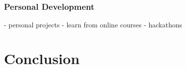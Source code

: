 \documentclass[10pt,letterpaper]{article}
\begin{document}
\subsubsection{Personal Development}
- personal projects
- learn from online courses
- hackathons

\clearpage
\section*{Conclusion}\label{conclusion}

\clearpage


\end{document}
